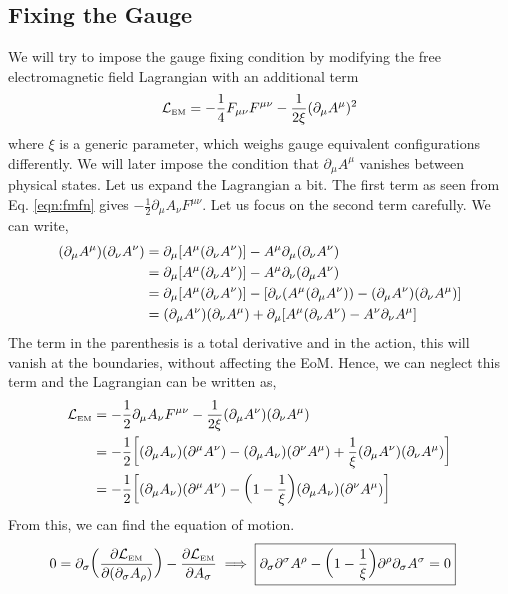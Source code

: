 \subsection{Fixing the Gauge}
We will try to impose the gauge fixing condition by modifying the free electromagnetic field Lagrangian with an additional term
$$\mathcal L_{\text{\tiny EM}} = - \frac{1}{4}F_{\mu\nu} F^{\mu\nu} - \frac{1}{2\xi} (\partial_\mu A^\mu)^2$$
where $\xi$ is a generic parameter, which weighs gauge equivalent configurations differently. We will later impose the condition that $\partial_\mu A^\mu$ vanishes between physical states. Let us expand the Lagrangian a bit. The first term as seen from Eq. \ref{eqn:fmfn} gives $-\frac{1}{2}\partial_\mu A_\nu F^{\mu\nu}$. Let us focus on the second term carefully. We can write,
\begin{align*}
    (\partial_\mu A^\mu)(\partial_\nu A^\nu) &= \partial_\mu\qty[A^\mu (\partial_\nu A^\nu)] - A^\mu \partial_\mu (\partial_\nu A^\nu)\\
    &=\partial_\mu\qty[A^\mu (\partial_\nu A^\nu)] - A^\mu \partial_\nu (\partial_\mu A^\nu)\\
    &=\partial_\mu\qty[A^\mu (\partial_\nu A^\nu)] - \qty[ \partial_\nu (A^\mu (\partial_\mu A^\nu)) -( \partial_\mu A^\nu )(\partial_\nu A^\mu)]\\
    &=( \partial_\mu A^\nu )(\partial_\nu A^\mu) +\partial_\mu \qty[A^\mu (\partial_\nu A^\nu) -A^\nu \partial_\nu A^\mu]
\end{align*}
The term in the parenthesis is a total derivative and in the action, this will vanish at the boundaries, without affecting the EoM. Hence, we can neglect this term and the Lagrangian can be written as,
\begin{align*}
    \mathcal L_{\text{\tiny EM}}  &=-\frac{1}{2}\partial_\mu A_\nu F^{\mu\nu} -\frac{1}{2\xi} ( \partial_\mu A^\nu )(\partial_\nu A^\mu) \\
    &=-\frac{1}{2}\qty[(\partial_\mu A_\nu)(\partial^\mu A^\nu) - (\partial_\mu A_\nu)(\partial^\nu A^\mu) +\frac{1}{\xi}( \partial_\mu A^\nu )(\partial_\nu A^\mu)]\\
    &=-\frac{1}{2}\qty[(\partial_\mu A_\nu)(\partial^\mu A^\nu) - \qty(1-\frac{1}{\xi})( \partial_\mu A_\nu )(\partial^\nu A^\mu)]
\end{align*}
From this, we can find the equation of motion.
\begin{align}\label{eqn:eomgf}
   0 & = \partial_\sigma \qty(\pdv{ \mathcal L_{\text{\tiny EM}}}{(\partial_\sigma A_\rho)})  - \pdv{\mathcal L_{\text{\tiny EM}}}{A_\sigma}\implies   \boxed{\partial_\sigma\partial^\sigma A^\rho - \qty(1-\frac{1}{\xi})\partial^\rho\partial_\sigma A^\sigma =0}
\end{align}
